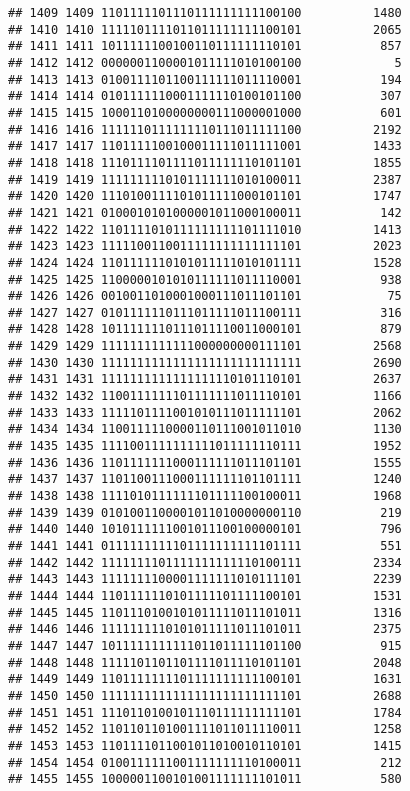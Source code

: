 \documentclass[]{article}
\begin{document}
\begin{verbatim}
## 1409 1409 1101111101110111111111100100          1480
## 1410 1410 1111101111011011111111100101          2065
## 1411 1411 1011111100100110111111110101           857
## 1412 1412 0000001100001011111010100100             5
## 1413 1413 0100111101100111111011110001           194
## 1414 1414 0101111110001111110100101100           307
## 1415 1415 1000110100000000111000001000           601
## 1416 1416 1111110111111110111011111100          2192
## 1417 1417 1101111100100011111011111001          1433
## 1418 1418 1110111101111011111110101101          1855
## 1419 1419 1111111110101111111010100011          2387
## 1420 1420 1110100111101011111000101101          1747
## 1421 1421 0100010101000001011000100011           142
## 1422 1422 1101111010111111111101111010          1413
## 1423 1423 1111100110011111111111111101          2023
## 1424 1424 1101111110101011111010101111          1528
## 1425 1425 1100000101010111111011110001           938
## 1426 1426 0010011010001000111011101101            75
## 1427 1427 0101111110111011111011100111           316
## 1428 1428 1011111110111011110011000101           879
## 1429 1429 1111111111111000000000111101          2568
## 1430 1430 1111111111111111111111111111          2690
## 1431 1431 1111111111111111110101110101          2637
## 1432 1432 1100111111101111111011110101          1166
## 1433 1433 1111101111001010111011111101          2062
## 1434 1434 1100111110000110111001011010          1130
## 1435 1435 1111001111111111011111110111          1952
## 1436 1436 1101111111000111111011101101          1555
## 1437 1437 1101100111000111111101101111          1240
## 1438 1438 1111010111111101111100100011          1968
## 1439 1439 0101001100001011010000000110           219
## 1440 1440 1010111111001011100100000101           796
## 1441 1441 0111111111101111111111101111           551
## 1442 1442 1111111101111111111110100111          2334
## 1443 1443 1111111100001111111010111101          2239
## 1444 1444 1101111110101111101111100101          1531
## 1445 1445 1101110100101011111011101011          1316
## 1446 1446 1111111110101011111011101011          2375
## 1447 1447 1011111111111011011111101100           915
## 1448 1448 1111101101101111011110101101          2048
## 1449 1449 1101111111101111111111100101          1631
## 1450 1450 1111111111111111111111111101          2688
## 1451 1451 1110110100101110111111111101          1784
## 1452 1452 1101101101001111011011110011          1258
## 1453 1453 1101111011001011010010110101          1415
## 1454 1454 0100111111001111111110100011           212
## 1455 1455 1000001100101001111111101011           580

\end{verbatim}
\end{document}
